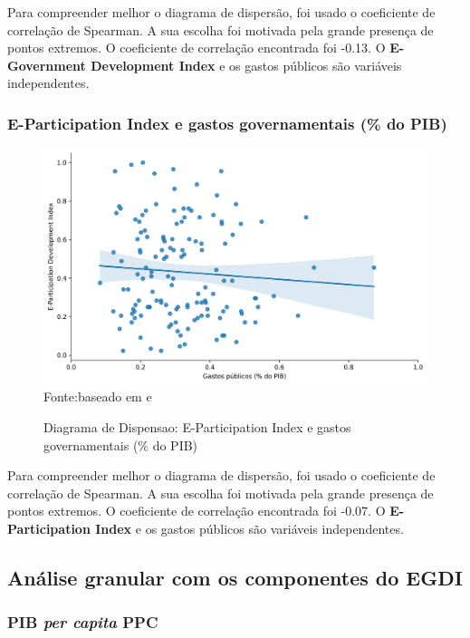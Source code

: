 Para compreender melhor o diagrama de dispersão, foi usado o coeficiente de correlação de Spearman. A sua escolha foi motivada pela grande presença de pontos extremos. O coeficiente de correlação encontrada foi -0.13. O \textbf{E-Government Development Index} e os gastos públicos são variáveis independentes.

\subsubsection{E-Participation Index e gastos governamentais (\% do PIB)}

\begin{figure}[H]
	\centering
	\caption{Diagrama de Dispensao: E-Participation Index e gastos governamentais (\% do PIB)}
	\includegraphics[width=1\linewidth]{figuras/egdi/dispersao_epart_govexpenditure}
	\label{fig:dispersao_epart_govexpenditure}
	\footnotesize{Fonte:baseado em \cite{ONU_EGDI_mapa} e \cite{FMI_gov_expenditure}}
\end{figure}

Para compreender melhor o diagrama de dispersão, foi usado o coeficiente de correlação de Spearman. A sua escolha foi motivada pela grande presença de pontos extremos. O coeficiente de correlação encontrada foi -0.07. O \textbf{E-Participation Index} e os gastos públicos são variáveis independentes.

\subsection{Análise granular com os componentes do EGDI}

\subsubsection{PIB \textit{per capita} PPC}

